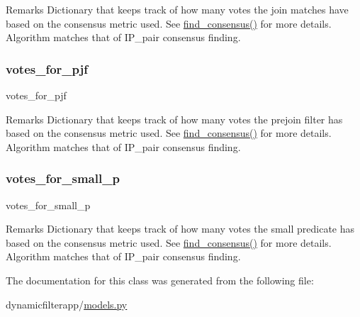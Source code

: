 \begin{DoxyRemark}{Remarks}
Dictionary that keeps track of how many votes the join matches have based on the consensus metric used. See \mbox{\hyperlink{classdynamicfilterapp_1_1models_1_1_join_a767745d0dad333b32a77be416c2bb117}{find\+\_\+consensus()}} for more details. Algorithm matches that of I\+P\+\_\+pair consensus finding. 
\end{DoxyRemark}
\mbox{\label{classdynamicfilterapp_1_1models_1_1_join_a54728e18d83bf4fb8232f87482dacd65}} 
\subsubsection{\texorpdfstring{votes\_for\_pjf}{votes\_for\_pjf}}
{\footnotesize\ttfamily votes\+\_\+for\+\_\+pjf}

\begin{DoxyRemark}{Remarks}
Dictionary that keeps track of how many votes the prejoin filter has based on the consensus metric used. See \mbox{\hyperlink{classdynamicfilterapp_1_1models_1_1_join_a767745d0dad333b32a77be416c2bb117}{find\+\_\+consensus()}} for more details. Algorithm matches that of I\+P\+\_\+pair consensus finding. 
\end{DoxyRemark}
\mbox{\label{classdynamicfilterapp_1_1models_1_1_join_a91816c1a011f3dfb47698f5313575446}} 
\subsubsection{\texorpdfstring{votes\_for\_small\_p}{votes\_for\_small\_p}}
{\footnotesize\ttfamily votes\+\_\+for\+\_\+small\+\_\+p}

\begin{DoxyRemark}{Remarks}
Dictionary that keeps track of how many votes the small predicate has based on the consensus metric used. See \mbox{\hyperlink{classdynamicfilterapp_1_1models_1_1_join_a767745d0dad333b32a77be416c2bb117}{find\+\_\+consensus()}} for more details. Algorithm matches that of I\+P\+\_\+pair consensus finding. 
\end{DoxyRemark}


The documentation for this class was generated from the following file\+:\begin{DoxyCompactItemize}
\item 
dynamicfilterapp/\mbox{\hyperlink{models_8py}{models.\+py}}\end{DoxyCompactItemize}
